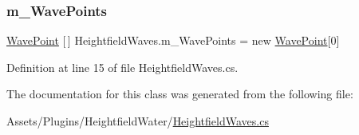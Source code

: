 \subsubsection{\texorpdfstring{m\+\_\+\+Wave\+Points}{m\_WavePoints}}
{\footnotesize\ttfamily \mbox{\hyperlink{class_heightfield_waves_1_1_wave_point}{Wave\+Point}} \mbox{[}$\,$\mbox{]} Heightfield\+Waves.\+m\+\_\+\+Wave\+Points = new \mbox{\hyperlink{class_heightfield_waves_1_1_wave_point}{Wave\+Point}}\mbox{[}0\mbox{]}}



Definition at line 15 of file Heightfield\+Waves.\+cs.



The documentation for this class was generated from the following file\+:\begin{DoxyCompactItemize}
\item 
Assets/\+Plugins/\+Heightfield\+Water/\mbox{\hyperlink{_heightfield_waves_8cs}{Heightfield\+Waves.\+cs}}\end{DoxyCompactItemize}
